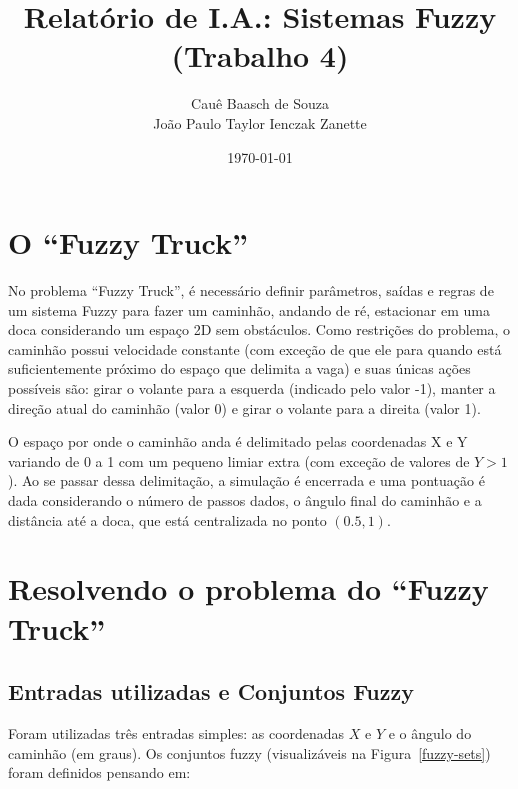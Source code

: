 \documentclass[twocolumn]{article}
\title{Relatório de I.A.: Sistemas Fuzzy (Trabalho 4)}
\author{Cauê Baasch de Souza \\
        João Paulo Taylor Ienczak Zanette}
\date{\today}
\begin{document}
    \maketitle{}

    \section{O ``Fuzzy Truck''}

    No problema ``Fuzzy Truck'', é necessário definir parâmetros, saídas e
    regras de um sistema Fuzzy para fazer um caminhão, andando de ré,
    estacionar em uma doca considerando um espaço 2D sem obstáculos. Como
    restrições do problema, o caminhão possui velocidade constante (com exceção
    de que ele para quando está suficientemente próximo do espaço que delimita
    a vaga) e suas únicas ações possíveis são: girar o volante para a esquerda
    (indicado pelo valor -1), manter a direção atual do caminhão (valor 0) e
    girar o volante para a direita (valor 1).

    O espaço por onde o caminhão anda é delimitado pelas coordenadas X e Y
    variando de 0 a 1 com um pequeno limiar extra (com exceção de valores de $Y
    > 1$). Ao se passar dessa delimitação, a simulação é encerrada e uma
    pontuação é dada considerando o número de passos dados, o ângulo final do
    caminhão e a distância até a doca, que está centralizada no ponto $(0.5,
    1)$.

    \section{Resolvendo o problema do ``Fuzzy Truck''}

    \subsection{Entradas utilizadas e Conjuntos Fuzzy}

    Foram utilizadas três entradas simples: as coordenadas $X$ e $Y$ e o ângulo
    do caminhão (em graus). Os conjuntos fuzzy (visualizáveis na
    Figura~\ref{fuzzy-sets}) foram definidos pensando em:
\end{document}
